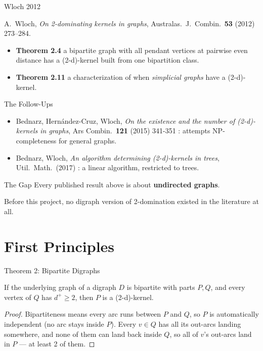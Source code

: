 \documentclass[11pt]{beamer}
\begin{document}
\begin{frame}{Wloch 2012}
  \begin{center}
    A.\ Wloch, \emph{On 2-dominating kernels in graphs}, Australas.\ J.\ Combin.\ \textbf{53} (2012) 273--284.
  \end{center}
  \begin{itemize}
    \item \textbf{Theorem 2.4} a bipartite graph with all pendant vertices
          at pairwise even distance has a (2-d)-kernel built from one bipartition class.
    \item \textbf{Theorem 2.11} a characterization of when \emph{simplicial
            graphs} have a (2-d)-kernel.
  \end{itemize}

\end{frame}

\begin{frame}{The Follow-Ups}
  \begin{itemize}
    \item Bednarz, Hern\'andez-Cruz, Wloch, \emph{On the existence and the
            number of (2-d)-kernels in graphs}, Ars Combin.\ \textbf{121} (2015)
          341-351 : attempts NP-completeness for general graphs.
    \item Bednarz, Wloch, \emph{An algorithm determining (2-d)-kernels in
            trees}, Util.\ Math.\ (2017) : a linear algorithm, restricted to trees.
  \end{itemize}
\end{frame}

\begin{frame}{The Gap}
  Every published result above is about \textbf{undirected graphs}.

  \bigskip
  Before this project, no digraph version of 2-domination existed in the
  literature at all.
\end{frame}

\section{First Principles}

\begin{frame}{Theorem 2: Bipartite Digraphs}
  \begin{theorem}
    If the underlying graph of a digraph $D$ is bipartite with parts $P, Q$, and
    every vertex of $Q$ has $d^+ \ge 2$, then $P$ is a (2-d)-kernel.
  \end{theorem}

  \begin{proof}
    Bipartiteness means every arc runs between $P$ and $Q$, so $P$ is
    automatically independent (no arc stays inside $P$). Every $v \in Q$ has all
    its out-arcs landing somewhere, and none of them can land back inside $Q$, so
    all of $v$'s out-arcs land in $P$ --- at least 2 of them. \qedhere
  \end{proof}
\end{frame}
\end{document}
